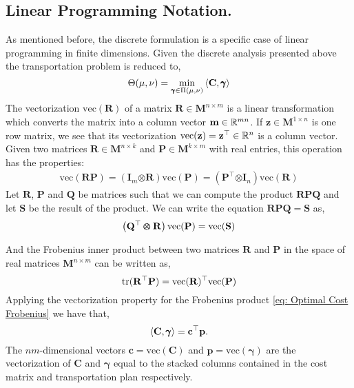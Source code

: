 \subsection{Linear Programming Notation.}
As mentioned before, the discrete formulation is a specific case of linear programming in finite dimensions. Given the discrete analysis presented above the transportation problem is reduced to,
\begin{equation}
	\Theta(\mu, \nu)=\min_{\pmb{\gamma}\in \Pi(\mu, \nu)}{\left\langle \mathbf{C}, \pmb{\gamma} \right\rangle}\label{eq: Optimal Cost Frobenius}
\end{equation}
The vectorization $\mathrm{vec}(\mathbf{R})$ of a matrix $\mathbf{R}\in \mathbf{M}^{n\times m}$ is a linear transformation which converts the matrix into a column vector $\mathbf{m}\in \mathbb{R}^{mn}$. If $\mathbf{z}\in \mathbf{M}^{1\times n}$ is one row matrix, we see that its vectorization $\mathrm{vec}(\mathbf{z})=\mathbf{z}^\top\in \mathbb{R}^n$ is a column vector. Given two matrices $\mathbf{R}\in \mathbf{M}^{n\times k}$ and $\mathbf{P}\in \mathbf{M}^{k\times m}$ with real entries, this operation has the properties:
\begin{align}
	\mathrm{vec}(\mathbf{RP})=(\mathbf{I}_m\pmb{\otimes}\mathbf{R})\mathrm{vec}(\mathbf{P})=(\mathbf{P}^\top\pmb{\otimes}\mathbf{I}_n)\mathrm{vec}(\mathbf{R})\label{eq: product vectorization}
\end{align}
Let $\mathbf{R}$, $\mathbf{P}$ and $\mathbf{Q}$ be matrices such that we can compute the product $\mathbf{RPQ}$ and let $\mathbf{S}$ be the result of the product. We can write the equation $\mathbf{RPQ}=\mathbf{S}$ as,
\begin{equation}
\left( \mathbf{Q}^\top \pmb{\otimes}\mathbf{R} \right)\mathrm{vec}(\mathbf{P})=\mathrm{vec}(\mathbf{S})\label{eq: vectorization product 3 matrices}
\end{equation}
 
And the Frobenius inner product between two matrices $\mathbf{R}$ and $\mathbf{P}$ in the space of real matrices $\mathbf{M}^{n\times m}$ can be written as,
\begin{equation}
	\mathrm{tr}(\mathbf{R^\top P})=\mathrm{vec}(\mathbf{R})^\top \mathrm{vec}(\mathbf{P})
\end{equation}
Applying the vectorization property for the Frobenius product \eqref{eq: Optimal Cost Frobenius} we have that,
\begin{equation*}
	\left\langle \mathbf{C},\pmb{\gamma} \right\rangle=\mathbf{c}^\top \mathbf{p}.
\end{equation*}
The $nm$-dimensional vectors $\mathbf{c}=\mathrm{vec}(\mathbf{C})$ and $\mathbf{p}=\mathrm{vec}(\pmb{\gamma})$ are the vectorization of $\mathbf{C}$ and $\pmb{\gamma}$ equal to the stacked columns contained in the cost matrix and transportation plan respectively.


